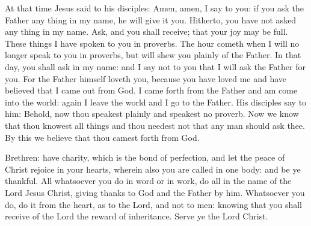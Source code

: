 \begin{multicols}{2}

At that time Jesus said to his disciples:
Amen, amen, I say to you: if
you ask the Father any thing in my name, he will give it you.  Hitherto, you
have not asked any thing in my name. Ask, and you shall receive; that your joy
may be full.  These things I have spoken to you in proverbs. The hour cometh
when I will no longer speak to you in proverbs, but will shew you plainly of
the Father.  In that day, you shall ask in my name: and I say not to you that I
will ask the Father for you.  For the Father himself loveth you, because you
have loved me and have believed that I came out from God.  I came forth from
the Father and am come into the world: again I leave the world and I go to the
Father.  His disciples say to him: Behold, now thou speakest plainly and
speakest no proverb.  Now we know that thou knowest all things and thou needest
not that any man should ask thee. By this we believe that thou camest forth
from God.


\bigskip




Brethren: have charity, which is the bond of
perfection,
and let the peace of Christ rejoice in your hearts, wherein also
you are called in one body: and be ye thankful.
All whatsoever you do in word or in work, do all in the name of
the Lord Jesus Christ, giving thanks to God and the Father by him.
Whatsoever you do, do it from the heart, as to the Lord, and not
to men:
knowing that you shall receive of the Lord the reward of
inheritance. Serve ye the Lord Christ.





\end{multicols}
